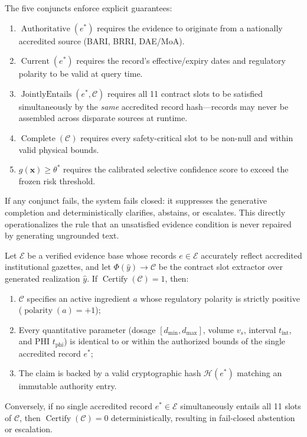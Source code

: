 The five conjuncts enforce explicit guarantees:
\begin{enumerate}
    \item[\textbf{(i)}] $\operatorname{Authoritative}(e^*)$ requires the evidence to originate from a nationally accredited source (BARI, BRRI, DAE/MoA).
    \item[\textbf{(ii)}] $\operatorname{Current}(e^*)$ requires the record's effective/expiry dates and regulatory polarity to be valid at query time.
    \item[\textbf{(iii)}] $\operatorname{JointlyEntails}(e^*, \mathcal{C})$ requires all 11 contract slots to be satisfied simultaneously by the \emph{same} accredited record hash---records may never be assembled across disparate sources at runtime.
    \item[\textbf{(iv)}] $\operatorname{Complete}(\mathcal{C})$ requires every safety-critical slot to be non-null and within valid physical bounds.
    \item[\textbf{(v)}] $g(\mathbf{x}) \ge \theta^*$ requires the calibrated selective confidence score to exceed the frozen risk threshold.
\end{enumerate}
If any conjunct fails, the system fails closed: it suppresses the generative completion and deterministically clarifies, abstains, or escalates. This directly operationalizes the rule that an unsatisfied evidence condition is never repaired by generating ungrounded text.

\begin{proposition}
\label{prop:soundness}
Let $\mathcal{E}$ be a verified evidence base whose records $e \in \mathcal{E}$ accurately reflect accredited institutional gazettes, and let $\Phi(\hat{y}) \rightarrow \mathcal{C}$ be the contract slot extractor over generated realization $\hat{y}$. If $\operatorname{Certify}(\mathcal{C}) = 1$, then:
\begin{enumerate}
    \item $\mathcal{C}$ specifies an active ingredient $a$ whose regulatory polarity is strictly positive ($\operatorname{polarity}(a) = +1$);
    \item Every quantitative parameter (dosage $[d_{\min}, d_{\max}]$, volume $v_s$, interval $t_{\text{int}}$, and PHI $t_{\text{phi}}$) is identical to or within the authorized bounds of the single accredited record $e^*$;
    \item The claim is backed by a valid cryptographic hash $\mathcal{H}(e^*)$ matching an immutable authority entry.
\end{enumerate}
Conversely, if no single accredited record $e^* \in \mathcal{E}$ simultaneously entails all 11 slots of $\mathcal{C}$, then $\operatorname{Certify}(\mathcal{C}) = 0$ deterministically, resulting in fail-closed abstention or escalation.
\end{proposition}

